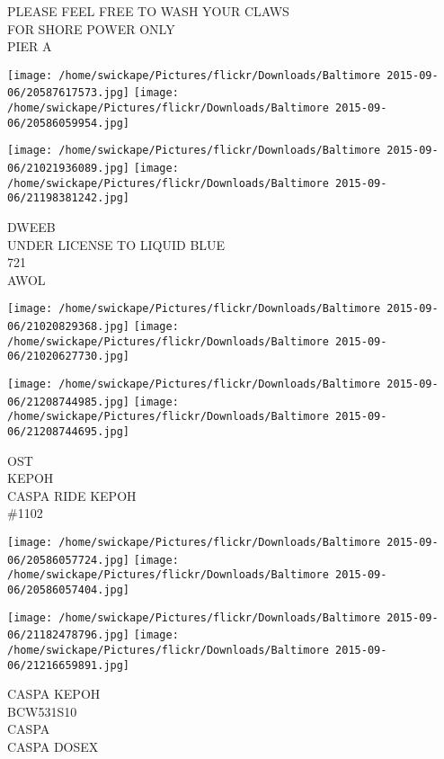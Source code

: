 \documentclass[10pt,letterpaper]{article}
\begin{document}
PLEASE FEEL FREE TO WASH YOUR CLAWS\\
FOR SHORE POWER ONLY\\
PIER A\\
\pagebreak

\texttt{[image: /home/swickape/Pictures/flickr/Downloads/Baltimore 2015-09-06/20587617573.jpg]}
\texttt{[image: /home/swickape/Pictures/flickr/Downloads/Baltimore 2015-09-06/20586059954.jpg]}

\texttt{[image: /home/swickape/Pictures/flickr/Downloads/Baltimore 2015-09-06/21021936089.jpg]}
\texttt{[image: /home/swickape/Pictures/flickr/Downloads/Baltimore 2015-09-06/21198381242.jpg]}

DWEEB\\
UNDER LICENSE TO LIQUID BLUE\\
721\\
AWOL\\
\pagebreak

\texttt{[image: /home/swickape/Pictures/flickr/Downloads/Baltimore 2015-09-06/21020829368.jpg]}
\texttt{[image: /home/swickape/Pictures/flickr/Downloads/Baltimore 2015-09-06/21020627730.jpg]}

\texttt{[image: /home/swickape/Pictures/flickr/Downloads/Baltimore 2015-09-06/21208744985.jpg]}
\texttt{[image: /home/swickape/Pictures/flickr/Downloads/Baltimore 2015-09-06/21208744695.jpg]}

OST\\
KEPOH\\
CASPA RIDE KEPOH\\
\#1102\\
\pagebreak

\texttt{[image: /home/swickape/Pictures/flickr/Downloads/Baltimore 2015-09-06/20586057724.jpg]}
\texttt{[image: /home/swickape/Pictures/flickr/Downloads/Baltimore 2015-09-06/20586057404.jpg]}

\texttt{[image: /home/swickape/Pictures/flickr/Downloads/Baltimore 2015-09-06/21182478796.jpg]}
\texttt{[image: /home/swickape/Pictures/flickr/Downloads/Baltimore 2015-09-06/21216659891.jpg]}

CASPA KEPOH\\
BCW531S10\\
CASPA\\
CASPA DOSEX\\
\pagebreak
\end{document}
